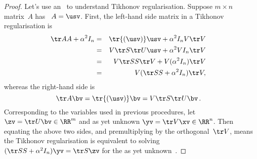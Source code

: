 \begin{proof} 
Let's use an \svd\ to understand Tikhonov regularisation.
Suppose \(m\times n\) matrix~\(A\) has \svd\ \(A=\usv\).
First, the left-hand side matrix in a Tikhonov regularisation is
\begin{eqnarray*}
\tr AA+\alpha^2I_n
&=&\tr{(\usv)}\usv+\alpha^2I_nV\tr V
\\&=&V\tr S\tr U\usv+\alpha^2VI_n\tr V
\\&=&V\tr SS\tr V+V(\alpha^2I_n)\tr V
\\&=&V(\tr SS+\alpha^2I_n)\tr V,
\end{eqnarray*}
whereas the right-hand side is 
\begin{equation*}
\tr A\bv =\tr{(\usv)}\bv =V\tr S\tr U\bv\,.
\end{equation*}
Corresponding to the variables used in previous procedures, let \(\zv=\tr U\bv\in\RR^m\) and as yet unknown \(\yv=\tr V\xv\in\RR^n\). 
Then equating the above two sides, and premultiplying by the orthogonal~\(\tr V\), means the Tikhonov regularisation is equivalent to solving \((\tr SS+\alpha^2I_n)\yv=\tr S\zv\) for the as yet unknown~\yv.


\end{proof}
